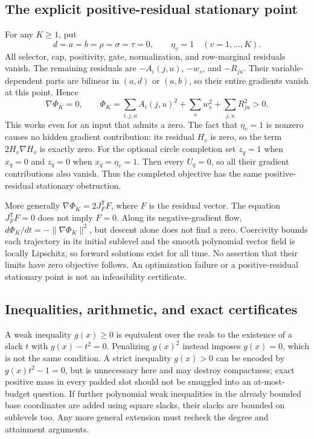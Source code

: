 \documentclass[11pt]{article}
\theoremstyle{remark}
\begin{document}
\subsection{The explicit positive-residual stationary point}
\label{sec:budget-stationary}
For any $K\ge1$, put
\[
 d=a=b=\rho=\sigma=\tau=0,\qquad \eta_v=1\quad(v=1,\ldots,K).
\]
All selector, cap, positivity, gate, normalization, and row-marginal
residuals vanish. The remaining residuals are $-A_i(j,u)$, $-w_s$, and
$-R_{ju}$. Their variable-dependent parts are bilinear in $(a,d)$ or
$(a,b)$, so their entire gradients vanish at this point. Hence
\[
 \nabla\Phi_K=0,\qquad
 \Phi_K=\sum_{i,j,u}A_i(j,u)^2+\sum_sw_s^2+\sum_{j,u}R_{ju}^2>0.
\]
This works even for an input that admits a zero. The fact that $\eta_v=1$
is nonzero causes no hidden gradient contribution: its residual $H_v$ is
zero, so the term $2H_v\nabla H_v$ is exactly zero.
For the optional circle completion set $z_q=1$ when $x_q=0$ and $z_q=0$
when $x_q=\eta_v=1$. Then every $U_q=0$, so all their gradient contributions
also vanish. Thus the completed objective has the same positive-residual
stationary obstruction.

More generally $\nabla\Phi_K=2J_F^{\mathsf T}F$, where $F$ is the residual
vector. The equation $J_F^{\mathsf T}F=0$ does not imply $F=0$. Along its
negative-gradient flow,
$d\Phi_K/dt=-\|\nabla\Phi_K\|^2$, but descent alone does not find a zero.
Coercivity bounds each trajectory in its initial sublevel and the smooth
polynomial vector field is locally Lipschitz, so forward solutions exist
for all time. No assertion that their limits have zero objective follows.
An optimization failure or a positive-residual stationary point is not an
infeasibility certificate.

\subsection{Inequalities, arithmetic, and exact certificates}
A weak inequality $g(x)\ge0$ is equivalent over the reals to the existence
of a slack $t$ with $g(x)-t^2=0$. Penalizing $g(x)^2$ instead imposes
$g(x)=0$, which is not the same condition. A strict inequality $g(x)>0$
can be encoded by $g(x)t^2-1=0$, but is unnecessary here and may destroy
compactness; exact positive mass in every padded slot should not be
smuggled into an at-most-budget question. If further polynomial weak
inequalities in the already bounded base coordinates are added using
square slacks, their slacks are bounded on sublevels too. Any more general
extension must recheck the degree and attainment arguments.
\end{document}
